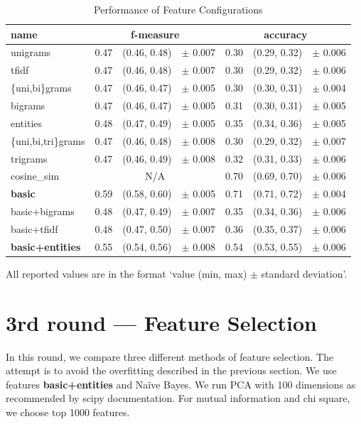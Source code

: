 \begin{table}[h!]

\centering
\begin{tabular}{lr@{~}r@{~}rr@{~}r@{~}r}
\toprule
\textbf{name}	& \multicolumn{3}{c}{\textbf{f-measure}} & \multicolumn{3}{c}{\textbf{accuracy}} \\
\midrule
unigrams& 0.47 & (0.46, 0.48) & $\pm$ 0.007 & 0.30 & (0.29, 0.32) & $\pm$ 0.006 \\
tfidf& 0.47 & (0.46, 0.48) & $\pm$ 0.007 & 0.30 & (0.29, 0.32) & $\pm$ 0.006 \\
\{uni,bi\}grams	& 0.47 & (0.46, 0.47) & $\pm$ 0.005 & 0.30 & (0.30, 0.31) & $\pm$ 0.004\\
bigrams & 0.47 & (0.46, 0.47) & $\pm$ 0.005 & 0.31 & (0.30, 0.31) & $\pm$ 0.005			\\
entities & 0.48 & (0.47, 0.49) & $\pm$ 0.005 & 0.35 & (0.34, 0.36) & $\pm$ 0.005		\\
\{uni,bi,tri\}grams & 0.47 & (0.46, 0.48) & $\pm$ 0.008 & 0.30 & (0.29, 0.32) & $\pm$ 0.007	\\
trigrams & 0.47 & (0.46, 0.49) & $\pm$ 0.008 & 0.32 & (0.31, 0.33) & $\pm$ 0.006		\\
cosine\_sim & \multicolumn{3}{c}{N/A} & 0.70 & (0.69, 0.70) & $\pm$ 0.006		\\
\textbf{basic} & 0.59 & (0.58, 0.60) & $\pm$ 0.005 & 0.71 & (0.71, 0.72) & $\pm$ 0.004		\\
basic+bigrams & 0.48 & (0.47, 0.49) & $\pm$ 0.007 & 0.35 & (0.34, 0.36) & $\pm$ 0.006		\\
basic+tfidf & 0.48 & (0.47, 0.50) & $\pm$ 0.007 & 0.36 & (0.35, 0.37) & $\pm$ 0.006			\\
\textbf{basic+entities} & 0.55 & (0.54, 0.56) & $\pm$ 0.008 & 0.54 & (0.53, 0.55) & $\pm$ 0.006		\\
\bottomrule
\end{tabular}


\caption{Performance of Feature Configurations}\label{tab:feat_perf}
All reported values are in the format `value (min, max) $\pm$ standard deviation'.
\end{table}


\section{3rd round --- Feature Selection}

In this round, we compare three different methods of feature selection.
The attempt is to avoid the overfitting described in the previous section.
We use features \textbf{basic+entities} and Na\"{i}ve Bayes.
We run PCA with 100 dimensions as recommended by scipy documentation.
For mutual information and chi square, we choose top 1000 features.

